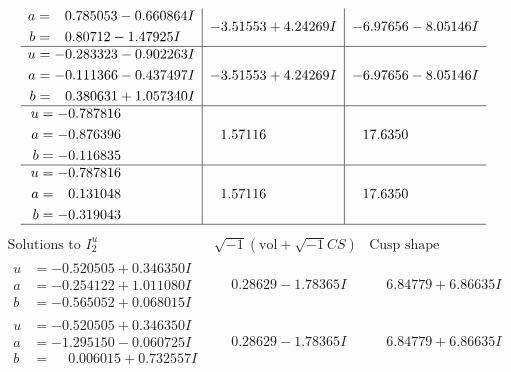 \documentclass[1p]{elsarticle_modified}
\theoremstyle{definition}
\newcommand{\I}{\sqrt{-1}}
\begin{document}
$$\begin{array}{c|c|c}
\begin{aligned}
a &= \phantom{-}0.785053 - 0.660864 I \\
b &= \phantom{-}0.80712 - 1.47925 I\end{aligned}
 & -3.51553 + 4.24269 I & -6.97656 - 8.05146 I \\ \hline\begin{aligned}
u &= -0.283323 - 0.902263 I \\
a &= -0.111366 - 0.437497 I \\
b &= \phantom{-}0.380631 + 1.057340 I\end{aligned}
 & -3.51553 + 4.24269 I & -6.97656 - 8.05146 I \\ \hline\begin{aligned}
u &= -0.787816\phantom{ +0.000000I} \\
a &= -0.876396\phantom{ +0.000000I} \\
b &= -0.116835\phantom{ +0.000000I}\end{aligned}
 & \phantom{-}1.57116\phantom{ +0.000000I} & \phantom{-}17.6350\phantom{ +0.000000I} \\ \hline\begin{aligned}
u &= -0.787816\phantom{ +0.000000I} \\
a &= \phantom{-}0.131048\phantom{ +0.000000I} \\
b &= -0.319043\phantom{ +0.000000I}\end{aligned}
 & \phantom{-}1.57116\phantom{ +0.000000I} & \phantom{-}17.6350\phantom{ +0.000000I}\\
 \hline 
 \end{array}$$\newpage$$\begin{array}{c|c|c}  
\text{Solutions to }I^u_{2}& \I (\text{vol} + \sqrt{-1}CS) & \text{Cusp shape}\\
 \hline 
\begin{aligned}
u &= -0.520505 + 0.346350 I \\
a &= -0.254122 + 1.011080 I \\
b &= -0.565052 + 0.068015 I\end{aligned}
 & \phantom{-}0.28629 - 1.78365 I & \phantom{-}6.84779 + 6.86635 I \\ \hline\begin{aligned}
u &= -0.520505 + 0.346350 I \\
a &= -1.295150 - 0.060725 I \\
b &= \phantom{-}0.006015 + 0.732557 I\end{aligned}
 & \phantom{-}0.28629 - 1.78365 I & \phantom{-}6.84779 + 6.86635 I \\ \hline\begin{aligned}

\end{aligned}
\end{array}$$
\end{document}
